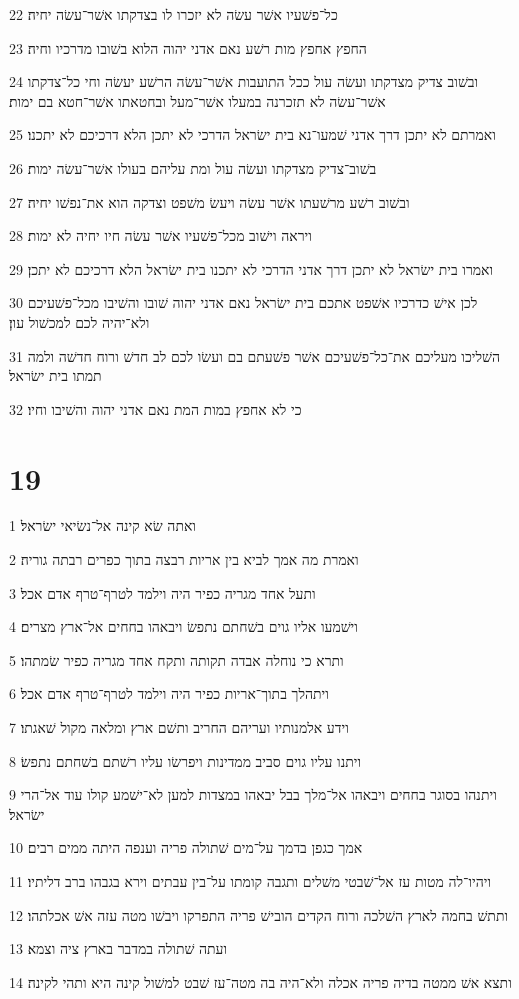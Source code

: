 \par 22 כל־פשׁעיו אשׁר עשׂה לא יזכרו לו בצדקתו אשׁר־עשׂה יחיה׃
\par 23 החפץ אחפץ מות רשׁע נאם אדני יהוה הלוא בשׁובו מדרכיו וחיה׃
\par 24 ובשׁוב צדיק מצדקתו ועשׂה עול ככל התועבות אשׁר־עשׂה הרשׁע יעשׂה וחי כל־צדקתו אשׁר־עשׂה לא תזכרנה במעלו אשׁר־מעל ובחטאתו אשׁר־חטא בם ימות׃
\par 25 ואמרתם לא יתכן דרך אדני שׁמעו־נא בית ישׂראל הדרכי לא יתכן הלא דרכיכם לא יתכנו׃
\par 26 בשׁוב־צדיק מצדקתו ועשׂה עול ומת עליהם בעולו אשׁר־עשׂה ימות׃
\par 27 ובשׁוב רשׁע מרשׁעתו אשׁר עשׂה ויעשׂ משׁפט וצדקה הוא את־נפשׁו יחיה׃
\par 28 ויראה וישׁוב מכל־פשׁעיו אשׁר עשׂה חיו יחיה לא ימות׃
\par 29 ואמרו בית ישׂראל לא יתכן דרך אדני הדרכי לא יתכנו בית ישׂראל הלא דרכיכם לא יתכן׃
\par 30 לכן אישׁ כדרכיו אשׁפט אתכם בית ישׂראל נאם אדני יהוה שׁובו והשׁיבו מכל־פשׁעיכם ולא־יהיה לכם למכשׁול עון׃
\par 31 השׁליכו מעליכם את־כל־פשׁעיכם אשׁר פשׁעתם בם ועשׂו לכם לב חדשׁ ורוח חדשׁה ולמה תמתו בית ישׂראל׃
\par 32 כי לא אחפץ במות המת נאם אדני יהוה והשׁיבו וחיו׃

\chapter{19}

\par 1 ואתה שׂא קינה אל־נשׂיאי ישׂראל׃
\par 2 ואמרת מה אמך לביא בין אריות רבצה בתוך כפרים רבתה גוריה׃
\par 3 ותעל אחד מגריה כפיר היה וילמד לטרף־טרף אדם אכל׃
\par 4 וישׁמעו אליו גוים בשׁחתם נתפשׂ ויבאהו בחחים אל־ארץ מצרים׃
\par 5 ותרא כי נוחלה אבדה תקותה ותקח אחד מגריה כפיר שׂמתהו׃
\par 6 ויתהלך בתוך־אריות כפיר היה וילמד לטרף־טרף אדם אכל׃
\par 7 וידע אלמנותיו ועריהם החריב ותשׁם ארץ ומלאה מקול שׁאגתו׃
\par 8 ויתנו עליו גוים סביב ממדינות ויפרשׂו עליו רשׁתם בשׁחתם נתפשׂ׃
\par 9 ויתנהו בסוגר בחחים ויבאהו אל־מלך בבל יבאהו במצדות למען לא־ישׁמע קולו עוד אל־הרי ישׂראל׃
\par 10 אמך כגפן בדמך על־מים שׁתולה פריה וענפה היתה ממים רבים׃
\par 11 ויהיו־לה מטות עז אל־שׁבטי משׁלים ותגבה קומתו על־בין עבתים וירא בגבהו ברב דליתיו׃
\par 12 ותתשׁ בחמה לארץ השׁלכה ורוח הקדים הובישׁ פריה התפרקו ויבשׁו מטה עזה אשׁ אכלתהו׃
\par 13 ועתה שׁתולה במדבר בארץ ציה וצמא׃
\par 14 ותצא אשׁ ממטה בדיה פריה אכלה ולא־היה בה מטה־עז שׁבט למשׁול קינה היא ותהי לקינה׃

